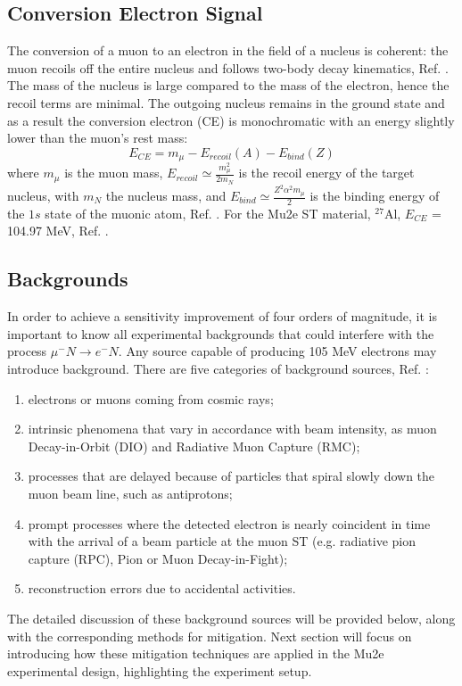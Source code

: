 \subsection{Conversion Electron Signal}
The conversion of a muon to an electron in the field of a nucleus is coherent: 
the muon recoils off the entire nucleus and follows two-body decay kinematics, 
Ref. \cite{bartoszek2015mu2e}. The mass of the nucleus is large compared to the 
mass of the electron, hence the recoil terms are minimal. The outgoing nucleus 
remains in the ground state and as a result the conversion electron (CE) is 
monochromatic with an energy slightly lower than the muon's rest mass:
\begin{equation}
    E_{CE} = m_\mu - E_{recoil}(A) - E_{bind}(Z) 
\end{equation}
where $m_\mu$ is the muon mass, $E_{recoil}\simeq \frac{m^2_\mu}{2 m_N}$ is 
the recoil energy of the target nucleus, with $m_N$ the nucleus mass, and 
$E_{bind}\simeq \frac{Z^2 \alpha^2 m_\mu}{2}$ is the binding energy of the 
$1s$ state of the muonic atom, Ref. \cite{universe9010054}. For the Mu2e 
ST material, $^{27}$Al, $E_{CE}$ = 104.97 MeV, Ref. \cite{PhysRevD.84.013006}.
\subsection{Backgrounds}\label{backgrounds}
In order to achieve a sensitivity improvement of four orders of magnitude, 
it is important to know all experimental backgrounds that could interfere with 
the process $\mu^- N \rightarrow e^- N $. Any source capable of producing 105 MeV 
electrons may introduce background. There are five categories of background 
sources, Ref. \cite{bartoszek2015mu2e}:
\begin{enumerate}
\item electrons or muons coming from cosmic rays;
\item intrinsic phenomena that vary in accordance with beam intensity, as muon 
Decay-in-Orbit (DIO) and Radiative Muon Capture (RMC);
\item processes that are delayed because of particles that spiral slowly down the 
muon beam line, such as antiprotons;
\item prompt processes where the detected electron is nearly coincident in time with 
the arrival of a beam particle at the muon ST (e.g. radiative pion capture (RPC), 
Pion or Muon Decay-in-Fight);
\item reconstruction errors due to accidental activities.
\end{enumerate}
The detailed discussion of these background sources will be provided below, along 
with the corresponding methods for mitigation. Next section will focus on introducing 
how these mitigation techniques are applied in the Mu2e experimental design, highlighting 
the experiment setup.
